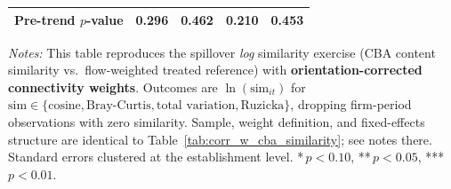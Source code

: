 \begin{table}[H]
\begin{tabular}{lcccc}
Pre-trend $p$-value & 0.296 & 0.462 & 0.210 & 0.453 \\
\hline\hline
\end{tabular}
\begin{minipage}{\linewidth}
\smallskip
\scriptsize\textit{Notes:} This table reproduces the spillover \emph{log} similarity exercise (CBA content similarity vs.\ flow-weighted treated reference) with \textbf{orientation-corrected connectivity weights}. Outcomes are $\ln(\text{sim}_{it})$ for $\text{sim} \in \{\text{cosine}, \text{Bray-Curtis}, \text{total variation}, \text{Ruzicka}\}$, dropping firm-period observations with zero similarity. Sample, weight definition, and fixed-effects structure are identical to Table~\ref{tab:corr_w_cba_similarity}; see notes there. Standard errors clustered at the establishment level. *\,$p<0.10$, **\,$p<0.05$, ***\,$p<0.01$.
\end{minipage}
\end{table}
